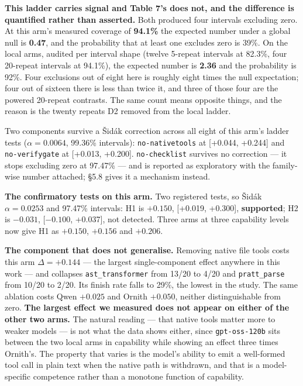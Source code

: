 \documentclass[
  10pt,
  a4paper,
]{article}
\let\oldtexttt\texttt
\renewcommand{\texttt}[1]{{\small\oldtexttt{#1}}}
\begin{document}
\textbf{This ladder carries signal and Table 7's does not, and the
difference is quantified rather than asserted.} Both produced four
intervals excluding zero. At this arm's measured coverage of
\textbf{94.1\%} the expected number under a global null is
\textbf{0.47}, and the probability that at least one excludes zero is
39\%. On the local arms, audited per interval shape (twelve 5-repeat
intervals at 82.3\%, four 20-repeat intervals at 94.1\%), the expected
number is \textbf{2.36} and the probability is 92\%. Four exclusions out
of eight here is roughly eight times the null expectation; four out of
sixteen there is less than twice it, and three of those four are the
powered 20-repeat contrasts. The same count means opposite things, and
the reason is the twenty repeats D2 removed from the local ladder.

Two components survive a Šidák correction across all eight of this arm's
ladder tests (\(\alpha = 0.0064\), 99.36\% intervals):
\texttt{no-nativetools} at {[}+0.044, +0.244{]} and
\texttt{no-verifygate} at {[}+0.013, +0.200{]}. \texttt{no-checklist}
survives no correction --- it stops excluding zero at 97.47\% --- and is
reported as exploratory with the family-wise number attached; §5.8 gives
it a mechanism instead.

\textbf{The confirmatory tests on this arm.} Two registered tests, so
Šidák \(\alpha = 0.0253\) and 97.47\% intervals: H1 is \(+0.150\),
{[}+0.019, +0.300{]}, \textbf{supported}; H2 is \(-0.031\),
{[}\(-0.100\), +0.037{]}, not detected. Three arms at three capability
levels now give H1 as \(+0.150\), \(+0.156\) and \(+0.206\).

\textbf{The component that does not generalise.} Removing native file
tools costs this arm \(\Delta = +0.144\) --- the largest
single-component effect anywhere in this work --- and collapses
\texttt{ast\_transformer} from 13/20 to 4/20 and \texttt{pratt\_parse}
from 10/20 to 2/20. Its finish rate falls to 29\%, the lowest in the
study. The same ablation costs Qwen \(+0.025\) and Ornith \(+0.050\),
neither distinguishable from zero. \textbf{The largest effect we
measured does not appear on either of the other two arms.} The natural
reading --- that native tools matter more to weaker models --- is not
what the data shows either, since \texttt{gpt-oss-120b} sits between the
two local arms in capability while showing an effect three times
Ornith's. The property that varies is the model's ability to emit a
well-formed tool call in plain text when the native path is withdrawn,
and that is a model-specific competence rather than a monotone function
of capability.
\end{document}
